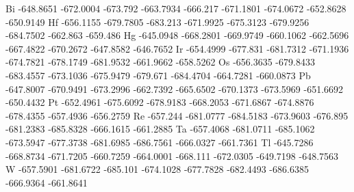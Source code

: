Bi	-648.8651	-672.0004	-673.792	-663.7934	-666.217	-671.1801	-674.0672	-652.8628	-650.9149
Hf	-656.1155	-679.7805	-683.213	-671.9925	-675.3123	-679.9256	-684.7502	-662.863	-659.486
Hg	-645.0948	-668.2801	-669.9749	-660.1062	-662.5696	-667.4822	-670.2672	-647.8582	-646.7652
Ir	-654.4999	-677.831	-681.7312	-671.1936	-674.7821	-678.1749	-681.9532	-661.9662	-658.5262
Os	-656.3635	-679.8433	-683.4557	-673.1036	-675.9479	-679.671	-684.4704	-664.7281	-660.0873
Pb	-647.8007	-670.9491	-673.2996	-662.7392	-665.6502	-670.1373	-673.5969	-651.6692	-650.4432
Pt	-652.4961	-675.6092	-678.9183	-668.2053	-671.6867	-674.8876	-678.4355	-657.4936	-656.2759
Re	-657.244	-681.0777	-684.5183	-673.9603	-676.895	-681.2383	-685.8328	-666.1615	-661.2885
Ta	-657.4068	-681.0711	-685.1062	-673.5947	-677.3738	-681.6985	-686.7561	-666.0327	-661.7361
Tl	-645.7286	-668.8734	-671.7205	-660.7259	-664.0001	-668.111	-672.0305	-649.7198	-648.7563
W	-657.5901	-681.6722	-685.101	-674.1028	-677.7828	-682.4493	-686.6385	-666.9364	-661.8641


